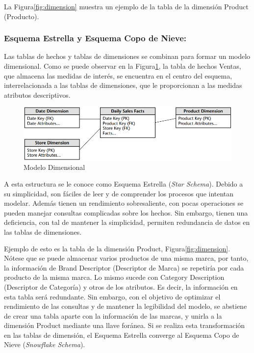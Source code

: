 La Figura\ref{fig:dimension} muestra un ejemplo de la tabla de la dimensi\'on Product (Producto). 
%
\subsubsection{Esquema Estrella y Esquema Copo de Nieve: }

Las tablas de hechos y tablas de dimensiones se combinan para formar un modelo dimensional. Como se puede observar en la 
Figura\ref{fig:dimmodel}, la tabla de hechos Ventas, que almacena las medidas de inter\'es, se encuentra en el centro del esquema, 
interrelacionada a las tablas de dimensiones, que le proporcionan a las medidas atributos descriptivos.

\begin{figure}[ht]
  \centering
  \includegraphics[width=1\textwidth]{../document/Graphics/star schema.png}
  \caption{Modelo Dimensional \cite{kimball2011data}}
  \label{fig:dimmodel}
\end{figure}

A esta estructura se le conoce como Esquema Estrella (\emph{Star Schema}). Debido a su simplicidad, son f\'aciles de leer 
y de comprender los procesos que intentan modelar. Adem\'as tienen un rendimiento sobresaliente, con pocas operaciones se 
pueden manejar consultas complicadas sobre los hechos. Sin embargo, tienen una deficiencia, con tal de mantener la 
simplicidad, permiten redundancia de datos en las tablas de dimensiones.

Ejemplo de esto es la tabla de la dimensi\'on Product, Figura\ref{fig:dimension}. N\'otese que se puede almacenar varios productos de una 
misma marca, por tanto, la información de Brand Descriptor (Descriptor de Marca) se repetir\'ia por cada producto de la 
misma marca. Lo mismo sucede con Category Description (Descriptor de Categor\'ia) y otros de los atributos. Es decir, la 
información en esta tabla ser\'a redundante. Sin embargo, con el objetivo de optimizar el rendimiento de las consultas y 
de mantener la legibilidad del modelo, se abstiene de crear una tabla aparte con la informaci\'on de las marcas, y unirla 
a la dimensi\'on Product mediante una llave for\'anea. Si se realiza esta transformaci\'on en las tablas de dimensi\'on, 
el Esquema Estrella converge al Esquema Copo de Nieve (\emph{Snowflake Schema}).

